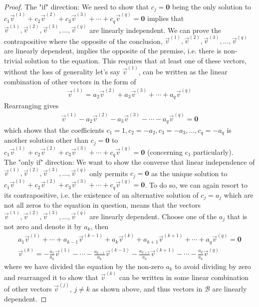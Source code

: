 \begin{proof}
The "if" direction: We need to show that $c_j = \textbf{0}$ being the only solution to $c_1\vec{v}^{(1)} + c_2\vec{v}^{(2)} + c_3\vec{v}^{(3)} + \cdots + c_q\vec{v}^{(q)} = \textbf{0}$ implies that $\vec{v}^{(1)}, \vec{v}^{(2)}, \vec{v}^{(3)}, \ldots, \vec{v}^{(q)}$ are linearly independent. We can prove the contrapositive where the opposite of the conclusion, $\vec{v}^{(1)}, \vec{v}^{(2)}, \vec{v}^{(3)}, \ldots, \vec{v}^{(q)}$ are linearly dependent, implies the opposite of the premise, i.e. there is non-trivial solution to the equation. This requires that at least one of these vectors, without the loss of generality let's say $\vec{v}^{(1)}$, can be written as the linear combination of other vectors in the form of
\begin{align*}
\vec{v}^{(1)} = a_2\vec{v}^{(2)} + a_3\vec{v}^{(3)} + \cdots + a_q\vec{v}^{(q)}
\end{align*}
Rearranging gives 
\begin{align*}
\vec{v}^{(1)} - a_2\vec{v}^{(2)} - a_3\vec{v}^{(3)} - \cdots - a_q\vec{v}^{(q)} = \textbf{0}
\end{align*}
which shows that the coefficients $c_1 = 1, c_2 = -a_2, c_3 = -a_3, \ldots, c_q = -a_q$ is another solution other than $c_j = \textbf{0}$ to $c_1\vec{v}^{(1)} + c_2\vec{v}^{(2)} + c_3\vec{v}^{(3)} + \cdots + c_q\vec{v}^{(q)} = \textbf{0}$ (concerning $c_1$ particularly). \\
The "only if" direction: We want to show the converse that linear independence of $\vec{v}^{(1)}, \vec{v}^{(2)}, \vec{v}^{(3)}, \ldots, \vec{v}^{(q)}$ only permits $c_j = \textbf{0}$ as the unique solution to $c_1\vec{v}^{(1)} + c_2\vec{v}^{(2)} + c_3\vec{v}^{(3)} + \cdots + c_q\vec{v}^{(q)} = \textbf{0}$. To do so, we can again resort to its contrapositive, i.e. the existence of an alternative solution of $c_j = a_j$ which are not all zeros to the equation in question, means that the vectors $\vec{v}^{(1)}, \vec{v}^{(2)}, \vec{v}^{(3)}, \ldots, \vec{v}^{(q)}$ are linearly dependent. Choose one of the $a_j$ that is not zero and denote it by $a_k$, then
\begin{align*}
a_1\vec{v}^{(1)} + \cdots + a_{k-1}\vec{v}^{(k-1)} + a_k\vec{v}^{(k)} + a_{k+1}\vec{v}^{(k+1)} + \cdots + a_q\vec{v}^{(q)} = \textbf{0} \\
\vec{v}^{(k)} = -\frac{a_1}{a_k}\vec{v}^{(1)} - \cdots - \frac{a_{k-1}}{a_k}\vec{v}^{(k-1)} - \frac{a_{k+1}}{a_k}\vec{v}^{(k+1)} - \cdots - \frac{a_q}{a_k}\vec{v}^{(q)} 
\end{align*}
where we have divided the equation by the non-zero $a_k$ to avoid dividing by zero and rearranged it to show that $\vec{v}^{(k)}$ can be written in some linear combination of other vectors $\vec{v}^{(j)}$, $j \neq k$ as shown above, and thus vectors in $\mathcal{B}$ are linearly dependent. 
\end{proof}
